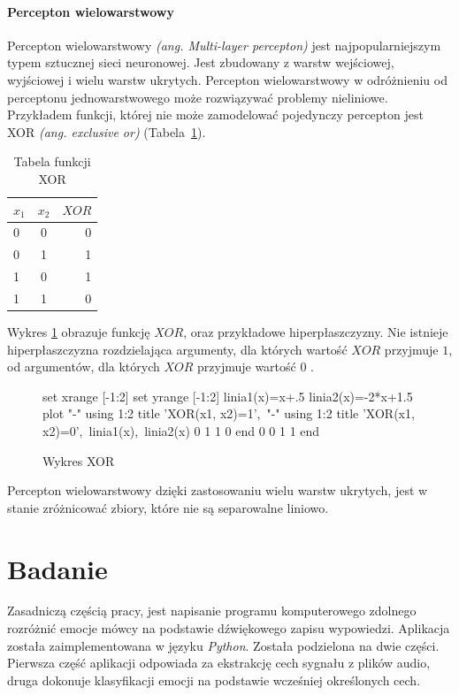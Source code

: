 \documentclass[a4paper,12pt,twoside,openany]{report}
\newcommand{\ang}[1]{\textit{(ang. #1)}}
\newcommand{\Tab}[1]{(Tabela~\ref{#1})}
\begin{document}
\subsubsection{Percepton wielowarstwowy}
Percepton wielowarstwowy \ang{Multi-layer percepton} jest najpopularniejszym typem sztucznej sieci neuronowej.
Jest zbudowany z warstw wejściowej, wyjściowej i wielu warstw ukrytych.
Percepton wielowarstwowy w odróżnieniu od perceptonu jednowarstwowego może rozwiązywać problemy nieliniowe.
Przykładem funkcji, której nie może zamodelować pojedynczy percepton jest XOR \ang{exclusive or} \Tab{tab:mlp:xor}.
\begin{table}[h]
	\centering
	\begin{tabular}{ |l|c|r| }
		\hline
		$x_1$	& $x_2$& $XOR$ \\ \hline
		0 	& 0 	& 0 \\ \hline
		0 	& 1 	& 1 \\ \hline
		1 	& 0 	& 1 \\ \hline
		1 	& 1 	& 0 \\ \hline
	\end{tabular}
	\caption{Tabela funkcji XOR}
	\label{tab:mlp:xor}
\end{table}
Wykres \ref{wyk:mlp:xor} obrazuje funkcję $XOR$, oraz przykładowe hiperpłaszczyzny.
Nie istnieje hiperpłaszczyzna rozdzielająca argumenty, dla których wartość $XOR$ przyjmuje $1$,
od argumentów, dla których $XOR$ przyjmuje wartość $0$ \cite{Labib2010}.
\begin{figure}[h]
	\label{wyk:mlp:sigm}
	\centering
	\begin{gnuplot}[terminal=pdf,terminaloptions=color]
		set xrange [-1:2]
		set yrange [-1:2]
		linia1(x)=x+.5
		linia2(x)=-2*x+1.5
		plot "-" using 1:2 title 'XOR(x1, x2)=1',\
		"-" using 1:2  title 'XOR(x1, x2)=0',\
		linia1(x),\
		linia2(x)
		0	1
		1	0
		end
		0	0
		1	1
		end
	\end{gnuplot}
	\caption{Wykres XOR}
	\label{wyk:mlp:xor}
\end{figure}
Percepton wielowarstwowy dzięki zastosowaniu wielu warstw ukrytych, 
jest w stanie zróżnicować zbiory, które nie są separowalne liniowo.
\chapter{Badanie}
Zasadniczą częścią pracy, jest napisanie programu komputerowego zdolnego rozróżnić emocje mówcy na podstawie dźwiękowego zapisu wypowiedzi.
Aplikacja została zaimplementowana w języku \textit{Python}. 
Została podzielona na dwie części. 
Pierwsza część aplikacji odpowiada za ekstrakcję cech sygnału z plików audio,
druga dokonuje klasyfikacji emocji na podstawie wcześniej określonych cech.
\end{document}

